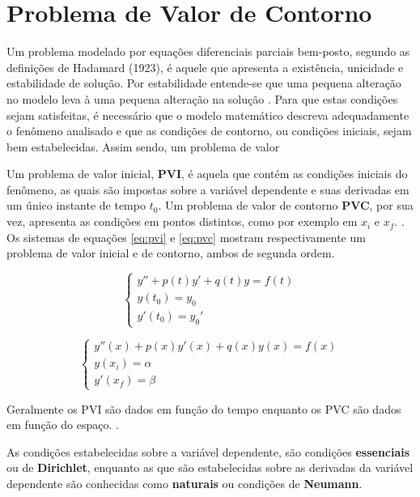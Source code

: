 \section{Problema de Valor de Contorno}


Um problema modelado por equações diferenciais parciais bem-posto, segundo as definições de Hadamard (1923), é aquele que 	apresenta a existência, unicidade e estabilidade de solução. Por estabilidade entende-se que uma pequena alteração no modelo leva à uma pequena alteração na solução \citep[p. 18]{moh}. Para que estas condições sejam satisfeitas, é necessário que o modelo matemático descreva adequadamente o fenômeno analisado e que as condições de contorno, ou condições iniciais, sejam bem estabelecidas. Assim sendo, um problema de valor 

Um problema de valor inicial, \textbf{PVI}, é aquela que contém as condições iniciais do fenômeno, as quais são impostas sobre a variável dependente e suas derivadas em um único instante de tempo $t_0$. Um problema de valor de contorno \textbf{PVC}, por sua vez, apresenta as condições em pontos distintos, como por exemplo em $x_i$ e $x_f$. \citep[p. 447]{boyce_diprima}. Os sistemas de equações \ref{eq:pvi} e \ref{eq:pvc} mostram respectivamente um problema de valor inicial e de contorno, ambos de segunda ordem.

\begin{equation}
	\label{eq:pvi}
	\begin{cases}
		y'' + p(t)y' + q(t)y = f(t) \\
		y(t_0) = y_0 \\
		y'(t_0) = y_0'
	\end{cases}
\end{equation}


\begin{equation}
	\label{eq:pvc}
	\begin{cases}
		y''(x) + p(x)y'(x) + q(x)y(x) = f(x) \\
		y(x_i) = \alpha \\
		y'(x_f) = \beta
	\end{cases}
\end{equation}

Geralmente os PVI são dados em função do tempo enquanto os PVC são dados em função do espaço. \citep[p. 447]{boyce_diprima}.

As condições estabelecidas sobre a variável dependente, são condições \textbf{essenciais} ou de \textbf{Dirichlet}, enquanto as que são estabelecidas sobre as derivadas da variável dependente são  conhecidas como \textbf{naturais} ou condições de \textbf{Neumann}.

